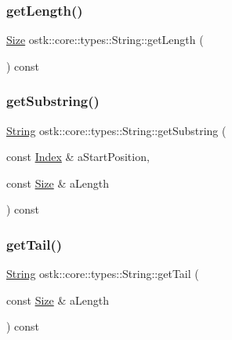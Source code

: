 \subsubsection{\texorpdfstring{get\+Length()}{getLength()}}
{\footnotesize\ttfamily \hyperlink{namespaceostk_1_1core_1_1types_acf68f214a245e35a7c1994c84dc56746}{Size} ostk\+::core\+::types\+::\+String\+::get\+Length (\begin{DoxyParamCaption}{ }\end{DoxyParamCaption}) const}

\mbox{\label{classostk_1_1core_1_1types_1_1_string_a9d0043c1313395defb939d47a6717107}} 
\subsubsection{\texorpdfstring{get\+Substring()}{getSubstring()}}
{\footnotesize\ttfamily \hyperlink{classostk_1_1core_1_1types_1_1_string}{String} ostk\+::core\+::types\+::\+String\+::get\+Substring (\begin{DoxyParamCaption}\item[{const \hyperlink{namespaceostk_1_1core_1_1types_a6e63c1b15b2e5bc87a43771c09fa913a}{Index} \&}]{a\+Start\+Position,  }\item[{const \hyperlink{namespaceostk_1_1core_1_1types_acf68f214a245e35a7c1994c84dc56746}{Size} \&}]{a\+Length }\end{DoxyParamCaption}) const}

\mbox{\label{classostk_1_1core_1_1types_1_1_string_aac6bc1ec037565caf85886b2e4177446}} 
\subsubsection{\texorpdfstring{get\+Tail()}{getTail()}}
{\footnotesize\ttfamily \hyperlink{classostk_1_1core_1_1types_1_1_string}{String} ostk\+::core\+::types\+::\+String\+::get\+Tail (\begin{DoxyParamCaption}\item[{const \hyperlink{namespaceostk_1_1core_1_1types_acf68f214a245e35a7c1994c84dc56746}{Size} \&}]{a\+Length }\end{DoxyParamCaption}) const}

